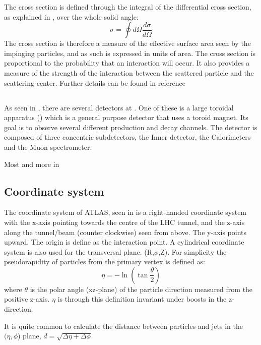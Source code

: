 The cross section is defined through the integral of the differential cross section, as explained in , over the whole solid angle:
\begin{equation}
\sigma = \oint d\Omega \frac{d\sigma}{d\Omega}
\end{equation}
The cross section is therefore a measure of the effective surface area seen by the impinging particles, and as such is expressed in units of area. The cross section is proportional to the probability that an interaction will occur. It also provides a measure of the strength of the interaction between the scattered particle and the scattering center.
Further details can be found in reference~\citep{Herr:2006}

\subsection{\abbrATLAS}
As seen in , there are several detectors at \abbrCERN. One of these is a large toroidal \abbrLHC apparatus (\abbrATLAS) which is a general purpose detector that uses a toroid magnet. Its goal is to observe several different production and decay channels. The detector is composed of three concentric subdetectors, the Inner detector, the Calorimeters and the Muon spectrometer.

Most and more in \citep{1129811}
\subsection{Coordinate system}
The coordinate system of ATLAS, seen in  is a right-handed coordinate system with the x-axis pointing towards the centre of the LHC tunnel, and the z-axis along the tunnel/beam (counter clockwise) seen from above. The y-axis points upward.
The origin is define as the interaction point.
A cylindrical coordinate system is also used for the transversal plane. (R,$\phi$,Z).
For simplicity the pseudorapidity of particles from the primary vertex is defined as:
\begin{equation}
\eta = - \ln( \tan\frac{\theta}{2})
\end{equation}
where $\theta$ is the polar angle (xz-plane) of the particle direction measured from the positive z-axis. 
$\eta$ is through this definition invariant under boosts in the z-direction.

It is quite common to calculate the distance between particles and jets in the $(\eta,\phi$) plane, $d=\sqrt{\Delta \eta + \Delta \phi}$  

